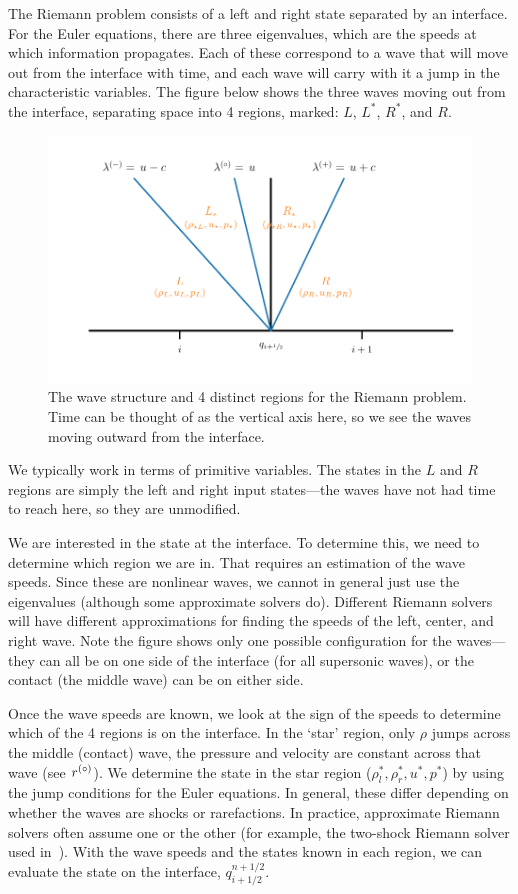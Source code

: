 The Riemann problem consists of a left and right state separated by an
interface.  For the Euler equations, there are three eigenvalues, which
are the speeds at which information propagates.  Each of these
correspond to a wave that will move out from the interface with time,
and each wave will carry with it a jump in the characteristic variables.  The
figure below shows the three waves moving out from the interface,
separating space into 4 regions, marked: $L$, $L^*$, $R^*$, and $R$.
\begin{figure}[h]
\centering
\includegraphics[width=4.5in]{riemann-waves}
\caption[The Riemann problem wave struction for the Euler
  equations.]{The wave structure and 4 distinct regions for the
  Riemann problem.  Time can be thought of as the vertical axis here,
  so we see the waves moving outward from the interface.}
\end{figure} 
We typically work in terms of primitive variables.  The states in the
$L$ and $R$ regions are simply the left and right input states---the
waves have not had time to reach here, so they are unmodified.

We are interested in the state at the interface.  To
determine this, we need to determine which region we are in.  That
requires an estimation of the wave speeds.  Since these are nonlinear
waves, we cannot in general just use the eigenvalues (although some
approximate solvers do).  Different Riemann solvers will have
different approximations for finding the speeds of the left, center,
and right wave.  Note the figure shows only one possible configuration
for the waves---they can all be on one side of the interface (for
all supersonic waves), or the contact (the middle wave) can be on either
side.

Once the wave speeds are known, we look at the sign of the speeds to
determine which of the 4 regions is on the interface.  In the `star'
region, only $\rho$ jumps across the middle (contact) wave, the
pressure and velocity are constant across that wave (see $r^{(\circ)}$).
We determine the state in the star region ($\rho_l^*, \rho_r^*, u^*,
p^*$) by using the jump conditions for the Euler equations.  In
general, these differ depending on whether the waves are shocks or
rarefactions.  In practice, approximate Riemann solvers often assume
one or the other (for example, the two-shock Riemann solver used
in~\cite{colellaglaz:1985}).  With the wave speeds and the states
known in each region, we can evaluate the state on the interface,
$q_{i+1/2}^{n+1/2}$.

